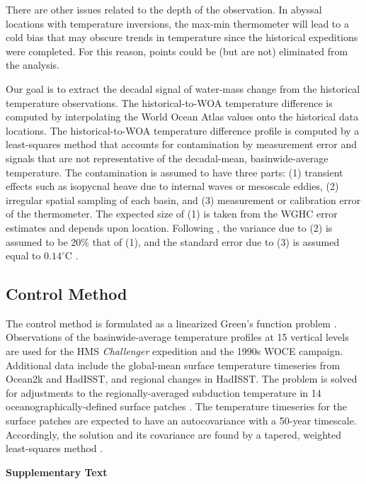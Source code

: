 \documentclass[12pt]{article}
\begin{document}
There are other issues related to the depth of the observation.  In
abyssal locations with temperature inversions, the max-min thermometer
will lead to a cold bias that may obscure trends in temperature since
the historical expeditions were completed. For this reason, points
could be (but are not) eliminated from the analysis.

Our goal is to extract the decadal signal of water-mass change from
the historical temperature observations.  The historical-to-WOA
temperature difference is computed by interpolating the World Ocean
Atlas values onto the historical data locations. The historical-to-WOA
temperature difference profile is computed by a least-squares method
that accounts for contamination by measurement error and signals that
are not representative of the decadal-mean, basinwide-average
temperature. The contamination is assumed to have three parts: (1)
transient effects such as isopycnal heave due to internal waves or
mesoscale eddies, (2) irregular spatial sampling of each basin, and
(3) measurement or calibration error of the thermometer.  The expected
size of (1) is taken from the WGHC error estimates and depends upon
location.  Following \cite{Huang--2015:Heaving}, the variance due to
(2) is assumed to be $20\%$ that of (1), and the standard error due to
(3) is assumed equal to $0.14^{\circ}$C
\cite{Roemmich-Gould-2012:135}.

\subsection{Control Method}

The control method is formulated as a linearized Green's function
problem \cite{Gebbie--2012:Tracer}. Observations of the
basinwide-average temperature profiles at 15 vertical levels are used
for the HMS {\it Challenger} expedition and the 1990s WOCE campaign.
Additional data include the global-mean surface temperature timeseries
from Ocean2k and HadISST, and regional changes in HadISST. The problem
is solved for adjustments to the regionally-averaged subduction
temperature in 14 oceanographically-defined surface patches
\cite{Gebbie-Huybers-2010:Total}. The temperature timeseries for the
surface patches are expected to have an autocovariance with a 50-year
timescale. Accordingly, the solution and its covariance are found by a
tapered, weighted least-squares method \cite{Wunsch--1996:Ocean}.

\newpage

{\bf {\Large Supplementary Text}}
\end{document}
